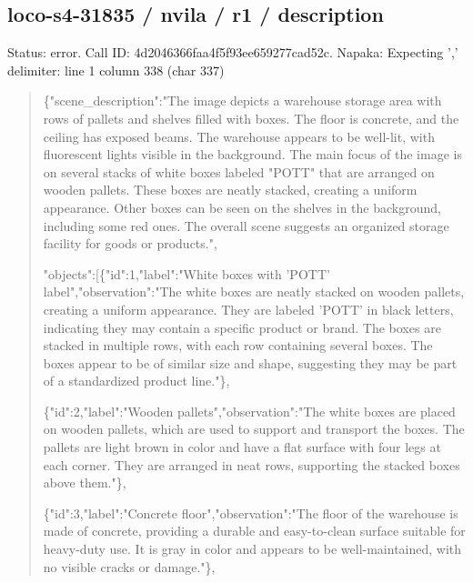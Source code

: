 \documentclass[10pt,a4paper]{article}
\begin{document}
\subsection*{loco-s4-31835 / nvila / r1 / description}
Status: error. Call ID: 4d2046366faa4f5f93ee659277cad52c. Napaka: Expecting ',' delimiter: line 1 column 338 (char 337)
\begin{quote}\footnotesize
\{"scene\_description":\allowbreak{}"The image depicts a warehouse storage area with rows of pallets and shelves filled with boxes. The floor is concrete,\allowbreak{} and the ceiling has exposed beams. The warehouse appears to be well-lit,\allowbreak{} with fluorescent lights visible in the background. The main focus of the image is on several stacks of white boxes labeled "POTT" that are arranged on wooden pallets. These boxes are neatly stacked,\allowbreak{} creating a uniform appearance. Other boxes can be seen on the shelves in the background,\allowbreak{} including some red ones. The overall scene suggests an organized storage facility for goods or products.",\allowbreak{}\par
\par
"objects":\allowbreak{}[\{"id":\allowbreak{}1,\allowbreak{}"label":\allowbreak{}"Whit\allowbreak{}e boxes with 'POTT' label",\allowbreak{}"observation":\allowbreak{}"The white boxes are neatly stacked on wooden pallets,\allowbreak{} creating a uniform appearance. They are labeled 'POTT' in black letters,\allowbreak{} indicating they may contain a specific product or brand. The boxes are stacked in multiple rows,\allowbreak{} with each row containing several boxes. The boxes appear to be of similar size and shape,\allowbreak{} suggesting they may be part of a standardized product line."\},\allowbreak{}\par
\par
\{"id":\allowbreak{}2,\allowbreak{}"label":\allowbreak{}"Wooden pallets",\allowbreak{}"observation":\allowbreak{}"The white boxes are placed on wooden pallets,\allowbreak{} which are used to support and transport the boxes. The pallets are light brown in color and have a flat surface with four legs at each corner. They are arranged in neat rows,\allowbreak{} supporting the stacked boxes above them."\},\allowbreak{}\par
\par
\{"id":\allowbreak{}3,\allowbreak{}"label":\allowbreak{}"Concrete floor",\allowbreak{}"observation":\allowbreak{}"The floor of the warehouse is made of concrete,\allowbreak{} providing a durable and easy-to-clean surface suitable for heavy-duty use. It is gray in color and appears to be well-maintained,\allowbreak{} with no visible cracks or damage."\},\allowbreak{}\par

\end{quote}
\end{document}
